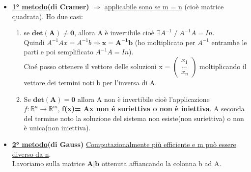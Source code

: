\documentclass[12pt]{article}
\begin{document}
\begin{itemize}
    \item \textbf{\underline{1° metodo}(di Cramer)} $\Rightarrow$ \underline{applicabile sono se m = n} (cioè matrice quadrata). Ho due casi:
    \begin{enumerate}
        \item se $\boldsymbol{det(A) \neq 0}$, allora A è invertibile cioè $\exists A^{-1} \;/\; A^{-1}A = In$.\\
        Quindi $A^{-1}Ax = A^{-1}b \Rightarrow \boldsymbol{x = A^{-1}b}$ (ho moltiplicato per $A^{-1}$ entrambe le parti e poi semplificato $A^{-1}A = In$).\\
        Cioé posso ottenere il vettore delle soluzioni x = $\begin{pmatrix}
            x_1\\
            ...\\
            x_n
        \end{pmatrix}$
        moltiplicando il vettore dei termini noti b per l'inversa di A.

        \item Se $\boldsymbol{det(A) = 0}$ allora A non è invertibile cioè l'applicazione\\ $f:\mathbb{R}^n \longrightarrow \mathbb{R}^m$, \textbf{f(x)= Ax non é suriettiva o non è iniettiva}. A seconda del termine noto la soluzione del sistema non esiste(non suriettiva) o non è unica(non iniettiva).
        
    \end{enumerate}
    \item \textbf{\underline{2° metodo}(di Gauss)} \underline{Computazionalmente più efficiente e m può essere diverso da n}.\\
    Lavoriamo sulla matrice $\boldsymbol{A|b}$ ottenuta affiancando la colonna b ad A.\\
\end{itemize}
\end{document}
